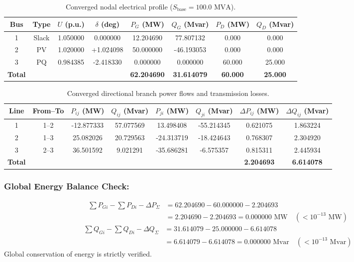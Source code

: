 \documentclass[12pt,a4paper,oneside]{report}
\begin{document}
\begin{table}[H]
\centering
\caption{Converged nodal electrical profile ($S_{\text{base}} = 100.0\text{ MVA}$).}
\label{tab:converged_bus}
\begin{tabular}{cccccccc}
\toprule
\textbf{Bus} & \textbf{Type} & \textbf{$U$ (p.u.)} & \textbf{$\delta$ (deg)} & \textbf{$P_G$ (MW)} & \textbf{$Q_G$ (Mvar)} & \textbf{$P_D$ (MW)} & \textbf{$Q_D$ (Mvar)} \\
\midrule
1 & Slack & 1.050000 & 0.000000 & 12.204690 & 77.807132 & 0.000 & 0.000 \\
2 & PV & 1.020000 & +1.024098 & 50.000000 & -46.193053 & 0.000 & 0.000 \\
3 & PQ & 0.984385 & -2.418330 & 0.000000 & 0.000000 & 60.000 & 25.000 \\
\midrule
\textbf{Total} & & & & \textbf{62.204690} & \textbf{31.614079} & \textbf{60.000} & \textbf{25.000} \\
\bottomrule
\end{tabular}
\end{table}

\begin{table}[H]
\centering
\caption{Converged directional branch power flows and transmission losses.}
\label{tab:converged_branch}
\begin{tabular}{cccccccc}
\toprule
\textbf{Line} & \textbf{From--To} & \textbf{$P_{ij}$ (MW)} & \textbf{$Q_{ij}$ (Mvar)} & \textbf{$P_{ji}$ (MW)} & \textbf{$Q_{ji}$ (Mvar)} & \textbf{$\Delta P_{ij}$ (MW)} & \textbf{$\Delta Q_{ij}$ (Mvar)} \\
\midrule
1 & 1--2 & -12.877333 & 57.077569 & 13.498408 & -55.214345 & 0.621075 & 1.863224 \\
2 & 1--3 & 25.082026 & 20.729563 & -24.313719 & -18.424643 & 0.768307 & 2.304920 \\
3 & 2--3 & 36.501592 & 9.021291 & -35.686281 & -6.575357 & 0.815311 & 2.445934 \\
\midrule
\textbf{Total} & & & & & & \textbf{2.204693} & \textbf{6.614078} \\
\bottomrule
\end{tabular}
\end{table}

\subsubsection{Global Energy Balance Check:}
\begin{align}
\sum P_{Gi} - \sum P_{Di} - \Delta P_{\Sigma} &= 62.204690 - 60.000000 - 2.204693 \nonumber \\
&= 2.204690 - 2.204693 = 0.000000\text{ MW} \quad (< 10^{-13}\text{ MW})
\end{align}
\begin{align}
\sum Q_{Gi} - \sum Q_{Di} - \Delta Q_{\Sigma} &= 31.614079 - 25.000000 - 6.614078 \nonumber \\
&= 6.614079 - 6.614078 = 0.000000\text{ Mvar} \quad (< 10^{-13}\text{ Mvar})
\end{align}
Global conservation of energy is strictly verified.
\end{document}
